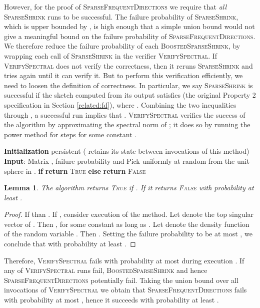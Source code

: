 \documentclass[11pt]{article}
\newcommand{\sfd}{\textsc{SparseFrequentDirections}\xspace}
\newcommand{\SSh}{\textsc{SparseShrink}\xspace}
\newcommand{\BSSh}{\textsc{BoostedSparseShrink}\xspace}
\newcommand{\vs}{\textsc{VerifySpectral}\xspace}
\newtheorem{lemma}{Lemma}[section]
\begin{document}
However, for the proof of \sfd we require that {\it all} \SSh runs to be successful. 
The failure probability of \SSh, which is upper bounded by , is high enough that a simple union bound would not give a meaningful bound on the failure probability of \sfd. We therefore reduce the failure probability of each \BSSh, by wrapping each call of \SSh in the verifier \vs.  If \vs does not verify the correctness, then it reruns \SSh and tries again until it can verify it.   
But to perform this verification efficiently, we need to loosen the definition of correctness.  In particular, we say \SSh is successful if the sketch  computed from its output satisfies  (the original Property 2 specification in Section \ref{related:fd}), where .  Combining the two inequalities through , a successful run implies that .  
\vs verifies the success of the algorithm by approximating the spectral norm of ; it does so by running the power method for  steps for some constant .  













\begin{algorithm}[H]
\caption{\vs}
\label{alg:verifyspectral}
\begin{algorithmic}
\STATE \textbf{Initialization} persistent  ( retains its state between invocations of this method)
\STATE \textbf{Input}: Matrix , failure probability 
\STATE  and 
\STATE Pick  uniformly at random from the unit sphere in .  
\STATE \textbf{if}  \textbf{return} \textsc{True}
\STATE \textbf{else} \textbf{return} \textsc{False}
\end{algorithmic}
\end{algorithm}
\begin{lemma} \label{lem:vs}
The  algorithm returns \textsc{True} if . 
If  it returns \textsc{False} with probability at least .
\end{lemma}
\begin{proof}
If  than .
If , consider execution  of the method. Let  denote the top singular vector of . Then  , for some constant  as long as  . Let  denote the density function of the random variable 
. Then . Setting the failure probability to be at most , we conclude that  with probability at least . 
\end{proof}

Therefore, \vs fails with probability at most   during execution . 
If any of \vs runs fail, \BSSh and hence \sfd potentially fail.
Taking the union bound over all invocations of \vs we obtain that \sfd fails with probability at most , hence it succeeds with probability at least . 
\end{document}
